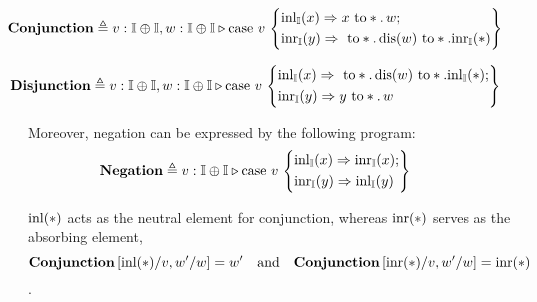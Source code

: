\begin{align*}
  & \hspace{-25pt}\textbf{Conjunction} \triangleq v:\typeI \oplus \typeI, w:\typeI \oplus \typeI \vljud \text{case } v\,
\left\{
    \begin{aligned} 
    &\inl_{\typeI}(x) \Rightarrow x \text{ to} *. \, w ; \\
    &\inr_{\typeI}(y) \Rightarrow   \text{ to} *. \,  \text{dis}(w) \text{ to} *. \inr_{\typeI}(*)  \\ 
  \end{aligned}  
  \right\}
\end{align*}

\begin{align*}
  & \hspace{-25pt}\textbf{Disjunction} \triangleq v:\typeI \oplus \typeI, w:\typeI \oplus \typeI \vljud \text{case } v\,
\left\{
    \begin{aligned} 
    &\inl_{\typeI}(x) \Rightarrow  \text{ to} *. \,  \text{dis}(w) \text{ to} *. \inl_{\typeI}(*) ; \\
    &\inr_{\typeI}(y) \Rightarrow  y \text{ to} *. \,  w  \\ 
  \end{aligned}  
  \right\}
\end{align*}

Moreover, negation can be expressed by the following program:
  \begin{align*}
  & \hspace{-25pt}\textbf{Negation} \triangleq v:\typeI \oplus \typeI \vljud \text{case } v\,
\left\{
    \begin{aligned} 
    &\inl_{\typeI}(x) \Rightarrow \inr_{\typeI}(x) ; \\
    &\inr_{\typeI}(y) \Rightarrow  \inl_{\typeI}(y)  \\ 
  \end{aligned}  
  \right\}
\end{align*}

  \begin{lemma} \label{lemma:inl_neutral}
     $\mathrm{inl}(*)$ acts as the neutral element for conjunction, whereas $\mathrm{inr}(*)$ serves as the absorbing element, \ie
     $$ \textbf{Conjunction} \, [\mathrm{inl}(*)/v,w'/w ] = w'  \quad \text{and} \quad \textbf{Conjunction} \, [\mathrm{inr}(*)/v,w'/w ] = \mathrm{inr}(*)$$.
  \end{lemma}

